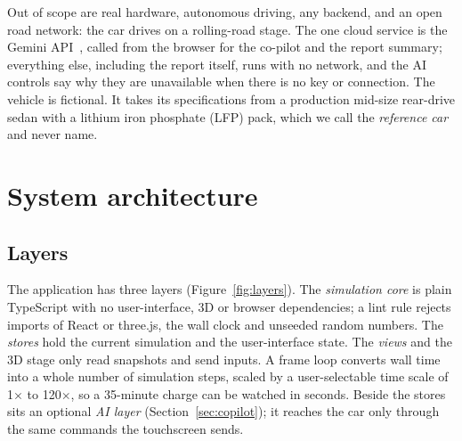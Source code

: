 \documentclass[10pt]{article}
\begin{document}
Out of scope are real hardware, autonomous driving, any backend, and an open road network: the car drives on a rolling-road stage. The one cloud service is the Gemini API~\cite{gemini_api}, called from the browser for the co-pilot and the report summary; everything else, including the report itself, runs with no network, and the AI controls say why they are unavailable when there is no key or connection. The vehicle is fictional. It takes its specifications from a production mid-size rear-drive sedan with a lithium iron phosphate (LFP) pack, which we call the \emph{reference car} and never name.

\section{System architecture}

\subsection{Layers}

The application has three layers (Figure~\ref{fig:layers}). The \emph{simulation core} is plain TypeScript with no user-interface, 3D or browser dependencies; a lint rule rejects imports of React or three.js, the wall clock and unseeded random numbers. The \emph{stores} hold the current simulation and the user-interface state. The \emph{views} and the 3D stage only read snapshots and send inputs. A frame loop converts wall time into a whole number of simulation steps, scaled by a user-selectable time scale of 1$\times$ to 120$\times$, so a 35-minute charge can be watched in seconds. Beside the stores sits an optional \emph{AI layer} (Section~\ref{sec:copilot}); it reaches the car only through the same commands the touchscreen sends.
\end{document}
